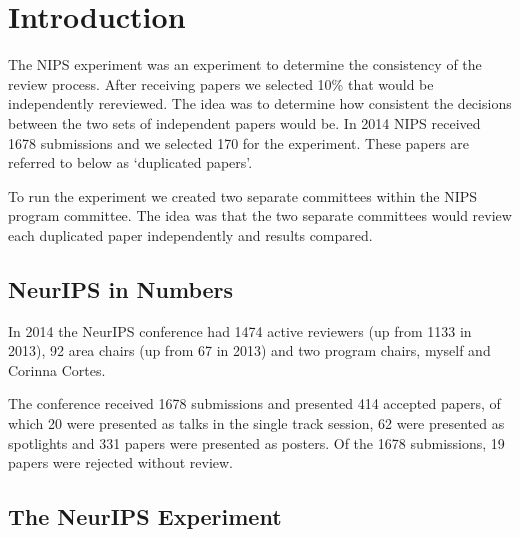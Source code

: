 


\hypertarget{introduction}{%
\section{Introduction}\label{introduction}}

The NIPS experiment was an experiment to determine the consistency of
the review process. After receiving papers we selected 10\% that would
be independently rereviewed. The idea was to determine how consistent
the decisions between the two sets of independent papers would be. In
2014 NIPS received 1678 submissions and we selected 170 for the
experiment. These papers are referred to below as `duplicated papers'.

To run the experiment we created two separate committees within the NIPS
program committee. The idea was that the two separate committees would
review each duplicated paper independently and results compared.

\hypertarget{neurips-in-numbers}{%
\subsection{NeurIPS in Numbers}\label{neurips-in-numbers}}

\begin{flushright}
\end{flushright}

In 2014 the NeurIPS conference had 1474 active reviewers (up from 1133
in 2013), 92 area chairs (up from 67 in 2013) and two program chairs,
myself and Corinna Cortes.

The conference received 1678 submissions and presented 414 accepted
papers, of which 20 were presented as talks in the single track session,
62 were presented as spotlights and 331 papers were presented as
posters. Of the 1678 submissions, 19 papers were rejected without
review.

\hypertarget{the-neurips-experiment}{%
\subsection{The NeurIPS Experiment}\label{the-neurips-experiment}}

